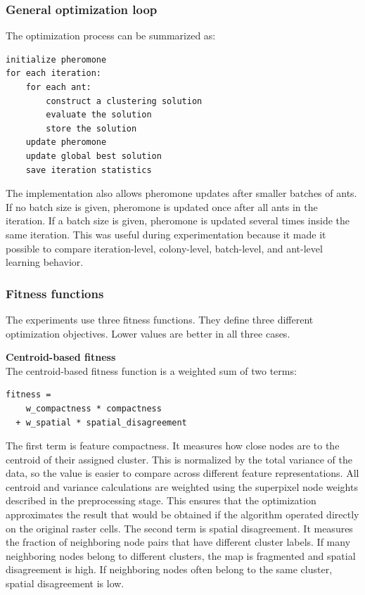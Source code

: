 \documentclass[11pt]{article}
\begin{document}
\subsubsection{General optimization loop}
The optimization process can be summarized as:
\begin{verbatim}
initialize pheromone
for each iteration:
    for each ant:
        construct a clustering solution
        evaluate the solution
        store the solution
    update pheromone
    update global best solution
    save iteration statistics
\end{verbatim}

The implementation also allows pheromone updates after smaller batches of ants. If no batch size is given, pheromone is updated once after all ants in the iteration. If a batch size is given, pheromone is updated several times inside the same iteration. This was useful during experimentation because it made it possible to compare iteration-level, colony-level, batch-level, and ant-level learning behavior.

\subsubsection{Fitness functions}
The experiments use three fitness functions. They define three different optimization objectives. Lower values are better in all three cases.

\textbf{Centroid-based fitness} \\
The centroid-based fitness function is a weighted sum of two terms:
\begin{verbatim}
fitness =
    w_compactness * compactness
  + w_spatial * spatial_disagreement
\end{verbatim}

The first term is feature compactness. It measures how close nodes are to the centroid of their assigned cluster. This is normalized by the total variance of the data, so the value is easier to compare across different feature representations. All centroid and variance calculations are weighted using the superpixel node weights described in the preprocessing stage. This ensures that the optimization approximates the result that would be obtained if the algorithm operated directly on the original raster cells.
The second term is spatial disagreement. It measures the fraction of neighboring node pairs that have different cluster labels. If many neighboring nodes belong to different clusters, the map is fragmented and spatial disagreement is high. If neighboring nodes often belong to the same cluster, spatial disagreement is low.
\end{document}
